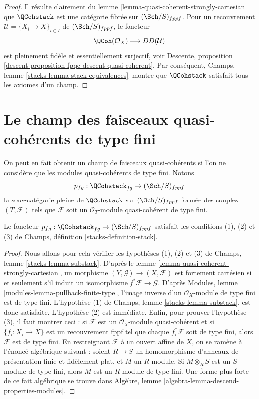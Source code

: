 \begin{proof}
Il résulte clairement du
lemme \ref{lemma-quasi-coherent-strongly-cartesian}
que $\QCohstack$ est une catégorie fibrée sur $(\Sch/S)_{fppf}$.
Pour un recouvrement $\mathcal{U} = \{X_i \to X\}_{i \in I}$ de
$(\Sch/S)_{fppf}$, le foncteur
$$
\QCoh(\mathcal{O}_X) \longrightarrow DD(\mathcal{U})
$$
est pleinement fidèle et essentiellement surjectif, voir
Descente, proposition \ref{descent-proposition-fpqc-descent-quasi-coherent}.
Par conséquent,
Champs, lemme \ref{stacks-lemma-stack-equivalences},
montre que $\QCohstack$ satisfait tous les
axiomes d'un champ.
\end{proof}





\section{Le champ des faisceaux quasi-cohérents de type fini}
\label{section-stack-of-finitely-generated-quasi-coherent-sheaves}

\noindent
On peut en fait obtenir un champ de faisceaux quasi-cohérents
si l'on ne considère que les modules quasi-cohérents de type fini.
Notons
$$
p_{fg} : \QCohstack_{fg} \to (\Sch/S)_{fppf}
$$
la sous-catégorie pleine de $\QCohstack$ sur $(\Sch/S)_{fppf}$
formée des couples $(T, \mathcal{F})$ tels que $\mathcal{F}$
soit un $\mathcal{O}_T$-module quasi-cohérent de type fini.

\begin{lemma}
\label{lemma-stack-of-finite-type-quasi-coherent-sheaves}
Le foncteur $p_{fg} : \QCohstack_{fg} \to (\Sch/S)_{fppf}$
satisfait les conditions (1), (2) et (3) de
Champs, définition \ref{stacks-definition-stack}.
\end{lemma}

\begin{proof}
Nous allons pour cela vérifier les hypothèses (1), (2) et (3) de
Champs, lemme \ref{stacks-lemma-substack}.
D'après le
lemme \ref{lemma-quasi-coherent-strongly-cartesian},
un morphisme $(Y, \mathcal{G}) \to (X, \mathcal{F})$ est
fortement cartésien si et seulement s'il induit un isomorphisme
$f^*\mathcal{F} \to \mathcal{G}$. D'après
Modules, lemme \ref{modules-lemma-pullback-finite-type},
l'image inverse d'un $\mathcal{O}_X$-module de type fini est de type
fini. L'hypothèse (1) de
Champs, lemme \ref{stacks-lemma-substack},
est donc satisfaite. L'hypothèse (2) est immédiate.
Enfin, pour prouver l'hypothèse (3), il faut montrer ceci :
si $\mathcal{F}$ est un $\mathcal{O}_X$-module quasi-cohérent
et si $\{f_i : X_i \to X\}$ est un recouvrement fppf tel que chaque
$f_i^*\mathcal{F}$ soit de type fini, alors $\mathcal{F}$ est de
type fini. En restreignant $\mathcal{F}$ à
un ouvert affine de $X$, on se ramène à l'énoncé algébrique suivant :
soient $R \to S$ un homomorphisme d'anneaux de présentation finie et fidèlement plat,
et $M$ un $R$-module. Si $M \otimes_R S$ est un
$S$-module de type fini, alors $M$ est un $R$-module de type fini.
Une forme plus forte de ce fait algébrique se trouve dans
Algèbre, lemme \ref{algebra-lemma-descend-properties-modules}.
\end{proof}

